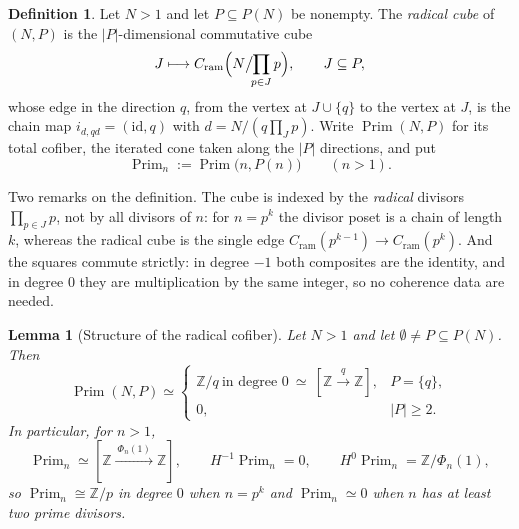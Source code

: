 \documentclass[11pt]{amsart}
\newtheorem{lemma}[theorem]{Lemma}
\theoremstyle{definition}
\newtheorem{definition}[theorem]{Definition}
\theoremstyle{remark}
\newcommand{\Z}{\mathbb Z}
\newcommand{\Prim}{\operatorname{Prim}}
\begin{document}
\begin{definition}\label{def:prim}
Let $N>1$ and let $P\subseteq P(N)$ be nonempty. The \emph{radical cube} of
$(N,P)$ is the $|P|$-dimensional commutative cube
\[
  J\longmapsto C_{\mathrm{ram}}\Bigl(N\big/\!\!\prod_{p\in J}p\Bigr),
  \qquad J\subseteq P,
\]
whose edge in the direction $q$, from the vertex at $J\cup\{q\}$ to the vertex
at $J$, is the chain map $i_{d,qd}=(\mathrm{id},q)$ with $d=N/(q\prod_{J}p)$.
Write $\Prim(N,P)$ for its total cofiber, the iterated cone taken along the
$|P|$ directions, and put
\[
  \Prim_n:=\Prim\bigl(n,P(n)\bigr)\qquad(n>1).
\]
\end{definition}

Two remarks on the definition. The cube is indexed by the \emph{radical}
divisors $\prod_{p\in J}p$, not by all divisors of $n$: for $n=p^k$ the divisor
poset is a chain of length $k$, whereas the radical cube is the single edge
$C_{\mathrm{ram}}(p^{k-1})\to C_{\mathrm{ram}}(p^k)$. And the squares commute
strictly: in degree $-1$ both composites are the identity, and in degree $0$
they are multiplication by the same integer, so no coherence data are needed.

\begin{lemma}[Structure of the radical cofiber]\label{lem:primstructure}
Let $N>1$ and let $\emptyset\ne P\subseteq P(N)$. Then
\[
  \Prim(N,P)\simeq
  \begin{cases}
    \Z/q\ \text{in degree }0\ \simeq\ [\Z\xrightarrow{\ q\ }\Z],
      & P=\{q\},\\[2pt]
    0, & |P|\ge2 .
  \end{cases}
\]
In particular, for $n>1$,
\[
  \Prim_n\simeq[\Z\xrightarrow{\ \Phi_n(1)\ }\Z],\qquad
  H^{-1}\Prim_n=0,\qquad H^0\Prim_n=\Z/\Phi_n(1),
\]
so $\Prim_n\cong\Z/p$ in degree $0$ when $n=p^k$ and $\Prim_n\simeq0$ when $n$
has at least two prime divisors.
\end{lemma}
\end{document}
